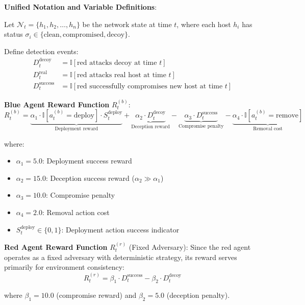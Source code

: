\documentclass[12pt,twoside]{article}
\begin{document}
\textbf{Unified Notation and Variable Definitions}:

Let $\mathcal{N}_t = \{h_1, h_2, \ldots, h_n\}$ be the network state at time $t$, where each host $h_i$ has status $\sigma_i \in \{\text{clean}, \text{compromised}, \text{decoy}\}$. 

Define detection events:
\begin{align}
D_t^{\text{decoy}} &= \mathbb{I}[\text{red attacks decoy at time } t] \\
D_t^{\text{real}} &= \mathbb{I}[\text{red attacks real host at time } t] \\
D_t^{\text{success}} &= \mathbb{I}[\text{red successfully compromises new host at time } t]
\end{align}

\textbf{Blue Agent Reward Function} $R_t^{(b)}$:
\begin{equation}
R_t^{(b)} = \underbrace{\alpha_1 \cdot \mathbb{I}[a_t^{(b)} = \text{deploy}] \cdot S_t^{\text{deploy}}}_{\text{Deployment reward}} + \underbrace{\alpha_2 \cdot D_t^{\text{decoy}}}_{\text{Deception reward}} - \underbrace{\alpha_3 \cdot D_t^{\text{success}}}_{\text{Compromise penalty}} - \underbrace{\alpha_4 \cdot \mathbb{I}[a_t^{(b)} = \text{remove}]}_{\text{Removal cost}}
\end{equation}

where:
\begin{itemize}
\item $\alpha_1 = 5.0$: Deployment success reward
\item $\alpha_2 = 15.0$: Deception success reward ($\alpha_2 \gg \alpha_1$)
\item $\alpha_3 = 10.0$: Compromise penalty  
\item $\alpha_4 = 2.0$: Removal action cost
\item $S_t^{\text{deploy}} \in \{0, 1\}$: Deployment action success indicator
\end{itemize}

\textbf{Red Agent Reward Function} $R_t^{(r)}$ (Fixed Adversary):
Since the red agent operates as a fixed adversary with deterministic strategy, its reward serves primarily for environment consistency:
\begin{equation}
R_t^{(r)} = \beta_1 \cdot D_t^{\text{success}} - \beta_2 \cdot D_t^{\text{decoy}}
\end{equation}

where $\beta_1 = 10.0$ (compromise reward) and $\beta_2 = 5.0$ (deception penalty).
\end{document}
